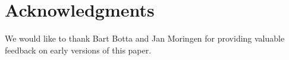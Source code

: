 \section{Acknowledgments} 

We would like to thank Bart Botta and Jan Moringen for providing
valuable feedback on early versions of this paper.
